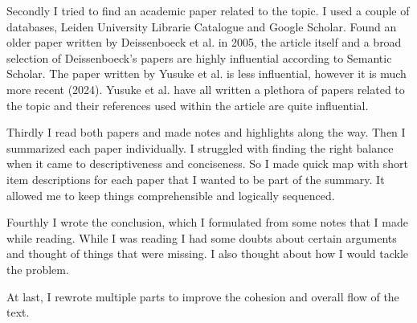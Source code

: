 \documentclass[a4paper,12pt]{article}
\begin{document}
\begin{multicols}{2}
Secondly I tried to find an academic paper related to the topic. I used a couple of databases, Leiden University Librarie Catalogue and Google Scholar. Found an older paper written by Deissenboeck et al. in 2005, the article itself and a broad selection of Deissenboeck's papers are highly influential according to Semantic Scholar. The paper written by Yusuke et al. is less influential, however it is much more recent (2024). Yusuke et al. have all written a plethora of papers related to the topic and their references used within the article are quite influential. 

Thirdly I read both papers and made notes and highlights along the way. Then I summarized each paper individually. I struggled with finding the right balance when it came to descriptiveness and conciseness. So I made quick map with short item descriptions for each paper that I wanted to be part of the summary. It allowed me to keep things comprehensible and logically sequenced. 

Fourthly I wrote the conclusion, which I formulated from some notes that I made while reading. While I was reading I had some doubts about certain arguments and thought of things that were missing. I also thought about how I would tackle the problem.

At last, I rewrote multiple parts to improve the cohesion and overall flow of the text.

\end{multicols}





\end{document}
